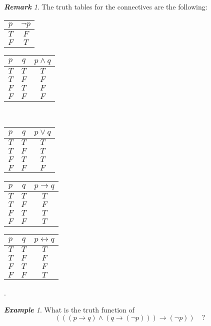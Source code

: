 \documentclass[a4paper,oneside,11pt,DIV=12,parskip=half]{scrartcl}
\theoremstyle{plain}
\theoremstyle{definition}
\newtheorem{remark, definition}[theorem]{Remark and Definition.}
\newtheorem{lemma, definition}[theorem]{Lemma and Definition.}
\newtheorem{theorem, definition}[theorem]{Theorem and Definition.}
\theoremstyle{remark}
\newtheorem*{remark}{\textbf{Remark}}
\newtheorem*{example}{\textbf{Example}}
\newtheorem*{remark, example}{\textbf{Remark and Exercise}}
\begin{document}
\begin{remark} The truth tables for the connectives are the following:
\begin{center}
\begin{tabular}{c|c}
     $p$ &  $\lnot p$  \\
     \hline
      $T$ & $F$ \\
      $F$ & $T$ \\
\end{tabular} \quad
\begin{tabular}{c|c|c}
     $p$ & $q$ & $p \land q$  \\
     \hline
     $T$ & $T$ & $T$ \\
     $T$ & $F$ & $F$ \\
     $F$ & $T$ & $F$ \\
     $F$ & $F$ & $F$ \\
\end{tabular} \\
\begin{tabular}{c|c|c}
     $p$ & $q$ & $p \lor q$  \\
     \hline
     $T$ & $T$ & $T$ \\
     $T$ & $F$ & $T$ \\
     $F$ & $T$ & $T$ \\
     $F$ & $F$ & $F$ \\
\end{tabular} \quad
\begin{tabular}{c|c|c}
     $p$ & $q$ & $p \rightarrow q$  \\
     \hline
     $T$ & $T$ & $T$ \\
     $T$ & $F$ & $F$ \\
     $F$ & $T$ & $T$ \\
     $F$ & $F$ & $T$ \\
\end{tabular} \quad
\begin{tabular}{c|c|c}
     $p$ & $q$ & $p \leftrightarrow q$  \\
     \hline
     $T$ & $T$ & $T$ \\
     $T$ & $F$ & $F$ \\
     $F$ & $T$ & $F$ \\
     $F$ & $F$ & $T$ \\
\end{tabular} .
\end{center}
\end{remark}

\begin{example}
What is the truth function of 
\[ (((p \rightarrow q) \land (q \rightarrow (\lnot p))) \rightarrow (\lnot p)) \quad ? \]

\end{example}
\end{document}
